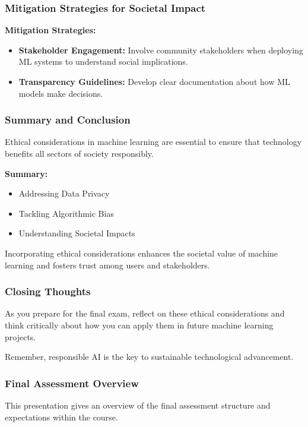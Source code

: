 \documentclass[aspectratio=169]{beamer}
\begin{document}
\begin{frame}[fragile]
    \frametitle{Mitigation Strategies for Societal Impact}
    \textbf{Mitigation Strategies:}
    \begin{itemize}
        \item \textbf{Stakeholder Engagement:} Involve community stakeholders when deploying ML systems to understand social implications.
        \item \textbf{Transparency Guidelines:} Develop clear documentation about how ML models make decisions.
    \end{itemize}
\end{frame}

\begin{frame}[fragile]
    \frametitle{Summary and Conclusion}
    Ethical considerations in machine learning are essential to ensure that technology benefits all sectors of society responsibly. 

    \textbf{Summary:}
    \begin{itemize}
        \item Addressing Data Privacy
        \item Tackling Algorithmic Bias
        \item Understanding Societal Impacts
    \end{itemize}

    Incorporating ethical considerations enhances the societal value of machine learning and fosters trust among users and stakeholders.
\end{frame}

\begin{frame}[fragile]
    \frametitle{Closing Thoughts}
    As you prepare for the final exam, reflect on these ethical considerations and think critically about how you can apply them in future machine learning projects. 

    Remember, responsible AI is the key to sustainable technological advancement.
\end{frame}

\begin{frame}[fragile]
    \frametitle{Final Assessment Overview}
    This presentation gives an overview of the final assessment structure and expectations within the course.
\end{frame}
\end{document}
